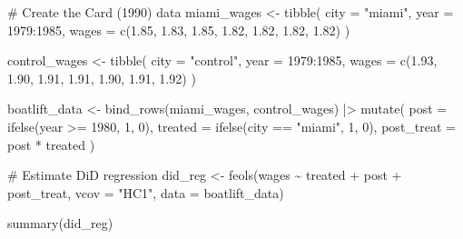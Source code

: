 \documentclass[
  letterpaper,
  DIV=11,
  numbers=noendperiod]{scrreprt}
\newenvironment{Shaded}{\begin{snugshade}}{\end{snugshade}}
\newcommand{\AttributeTok}[1]{\textcolor[rgb]{0.40,0.45,0.13}{#1}}
\newcommand{\CommentTok}[1]{\textcolor[rgb]{0.37,0.37,0.37}{#1}}
\newcommand{\DecValTok}[1]{\textcolor[rgb]{0.68,0.00,0.00}{#1}}
\newcommand{\FloatTok}[1]{\textcolor[rgb]{0.68,0.00,0.00}{#1}}
\newcommand{\FunctionTok}[1]{\textcolor[rgb]{0.28,0.35,0.67}{#1}}
\newcommand{\NormalTok}[1]{\textcolor[rgb]{0.00,0.23,0.31}{#1}}
\newcommand{\OtherTok}[1]{\textcolor[rgb]{0.00,0.23,0.31}{#1}}
\newcommand{\SpecialCharTok}[1]{\textcolor[rgb]{0.37,0.37,0.37}{#1}}
\newcommand{\StringTok}[1]{\textcolor[rgb]{0.13,0.47,0.30}{#1}}
\begin{document}
\begin{Shaded}
\begin{Highlighting}[]
\CommentTok{\# Create the Card (1990) data}
\NormalTok{miami\_wages }\OtherTok{\textless{}{-}} \FunctionTok{tibble}\NormalTok{(}
    \AttributeTok{city =} \StringTok{"miami"}\NormalTok{,}
    \AttributeTok{year =} \DecValTok{1979}\SpecialCharTok{:}\DecValTok{1985}\NormalTok{,}
    \AttributeTok{wages =} \FunctionTok{c}\NormalTok{(}\FloatTok{1.85}\NormalTok{, }\FloatTok{1.83}\NormalTok{, }\FloatTok{1.85}\NormalTok{, }\FloatTok{1.82}\NormalTok{, }\FloatTok{1.82}\NormalTok{, }\FloatTok{1.82}\NormalTok{, }\FloatTok{1.82}\NormalTok{)}
\NormalTok{)}

\NormalTok{control\_wages }\OtherTok{\textless{}{-}} \FunctionTok{tibble}\NormalTok{(}
    \AttributeTok{city =} \StringTok{"control"}\NormalTok{,}
    \AttributeTok{year =} \DecValTok{1979}\SpecialCharTok{:}\DecValTok{1985}\NormalTok{,}
    \AttributeTok{wages =} \FunctionTok{c}\NormalTok{(}\FloatTok{1.93}\NormalTok{, }\FloatTok{1.90}\NormalTok{, }\FloatTok{1.91}\NormalTok{, }\FloatTok{1.91}\NormalTok{, }\FloatTok{1.90}\NormalTok{, }\FloatTok{1.91}\NormalTok{, }\FloatTok{1.92}\NormalTok{)}
\NormalTok{)}

\NormalTok{boatlift\_data }\OtherTok{\textless{}{-}} \FunctionTok{bind\_rows}\NormalTok{(miami\_wages, control\_wages) }\SpecialCharTok{|\textgreater{}}
    \FunctionTok{mutate}\NormalTok{(}
        \AttributeTok{post =} \FunctionTok{ifelse}\NormalTok{(year }\SpecialCharTok{\textgreater{}=} \DecValTok{1980}\NormalTok{, }\DecValTok{1}\NormalTok{, }\DecValTok{0}\NormalTok{),}
        \AttributeTok{treated =} \FunctionTok{ifelse}\NormalTok{(city }\SpecialCharTok{==} \StringTok{"miami"}\NormalTok{, }\DecValTok{1}\NormalTok{, }\DecValTok{0}\NormalTok{),}
        \AttributeTok{post\_treat =}\NormalTok{ post }\SpecialCharTok{*}\NormalTok{ treated}
\NormalTok{    )}

\CommentTok{\# Estimate DiD regression}
\NormalTok{did\_reg }\OtherTok{\textless{}{-}} \FunctionTok{feols}\NormalTok{(wages }\SpecialCharTok{\textasciitilde{}}\NormalTok{ treated }\SpecialCharTok{+}\NormalTok{ post }\SpecialCharTok{+}\NormalTok{ post\_treat,}
                 \AttributeTok{vcov =} \StringTok{"HC1"}\NormalTok{,}
                 \AttributeTok{data =}\NormalTok{ boatlift\_data)}

\FunctionTok{summary}\NormalTok{(did\_reg)}
\end{Highlighting}
\end{Shaded}
\end{document}
